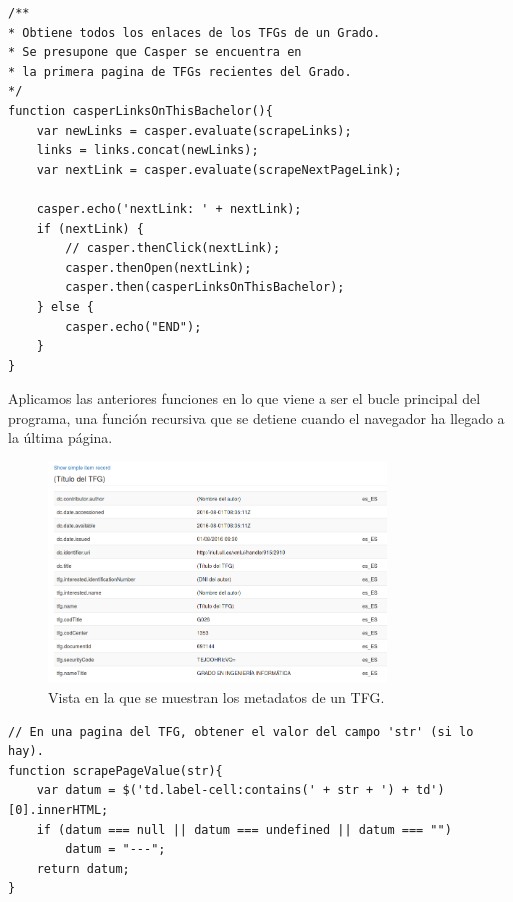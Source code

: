 \begin{center}
\begin{minipage}{\linewidth}
\begin{lstlisting}[caption=Función de obtención de todos los enlaces de TFG.]
/**
* Obtiene todos los enlaces de los TFGs de un Grado.
* Se presupone que Casper se encuentra en
* la primera pagina de TFGs recientes del Grado.
*/
function casperLinksOnThisBachelor(){
    var newLinks = casper.evaluate(scrapeLinks);
    links = links.concat(newLinks);
    var nextLink = casper.evaluate(scrapeNextPageLink);

    casper.echo('nextLink: ' + nextLink);
    if (nextLink) {
        // casper.thenClick(nextLink);
        casper.thenOpen(nextLink);
        casper.then(casperLinksOnThisBachelor);
    } else {
        casper.echo("END");
    }
}
\end{lstlisting}
\end{minipage}
\end{center}

Aplicamos las anteriores funciones en lo que viene a ser el bucle principal del programa, una función recursiva que se detiene cuando el navegador ha llegado a la última página.

\begin{center}
\begin{figure}[!ht]
  \caption{Vista en la que se muestran los metadatos de un TFG.}
  \label{fig:metadata_view}
  \centering
    \includegraphics[width=0.8\textwidth]{Images/metadata_view}
\end{figure}
\end{center}

\begin{center}
\begin{minipage}{\linewidth}
\begin{lstlisting}[caption=Función de obtención de metadato por nombre de etiqueta.]
// En una pagina del TFG, obtener el valor del campo 'str' (si lo hay).
function scrapePageValue(str){
    var datum = $('td.label-cell:contains(' + str + ') + td')[0].innerHTML;
    if (datum === null || datum === undefined || datum === "")
        datum = "---";
    return datum;
}
\end{lstlisting}
\end{minipage}
\end{center}

